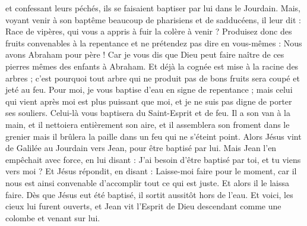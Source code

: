 \begin{multicols}{2}
et confessant leurs péchés, ils se faisaient baptiser par lui dans le Jourdain.
Mais, voyant venir à son baptême beaucoup de pharisiens et de sadducéens, il leur dit : Race de vipères, qui vous a appris à fuir la colère à venir ?
Produisez donc des fruits convenables à la repentance
et ne prétendez pas dire en vous-mêmes : Nous avons Abraham pour père ! Car je vous dis que Dieu peut faire naître de ces pierres mêmes des enfants à Abraham.
Et déjà la cognée est mise à la racine des arbres ; c'est pourquoi tout arbre qui ne produit pas de bons fruits sera coupé et jeté au feu.
Pour moi, je vous baptise d'eau en signe de repentance ; mais celui qui vient après moi est plus puissant que moi, et je ne suis pas digne de porter ses souliers. Celui-là vous baptisera du Saint-Esprit et de feu.
Il a son van à la main, et il nettoiera entièrement son aire, et il assemblera son froment dans le grenier mais il brûlera la paille dans un feu qui ne s'éteint point.
Alors Jésus vint de Galilée au Jourdain vers Jean, pour être baptisé par lui.
Mais Jean l'en empêchait avec force, en lui disant : J'ai besoin d'être baptisé par toi, et tu viens vers moi ?
Et Jésus répondit, en disant : Laisse-moi faire pour le moment, car il nous est ainsi convenable d'accomplir tout ce qui est juste. Et alors il le laissa faire.
Dès que Jésus eut été baptisé, il sortit aussitôt hors de l'eau. Et voici, les cieux lui furent ouverts, et Jean vit l'Esprit de Dieu descendant comme une colombe et venant sur lui.

\end{multicols}
